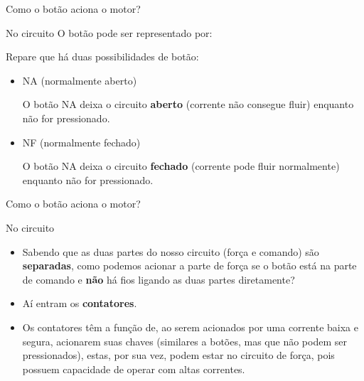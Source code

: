 \begin{frame}{Como o botão aciona o motor?}
	\begin{block}{No circuito}
		O botão pode ser representado por:
	\end{block}
	
	\medskip
	\begin{center}
	\end{center}
	
	\vspace{-1em}
	
	\begin{block}{}
		Repare que há duas possibilidades de botão:
		\begin{itemize}
			\item NA (normalmente aberto)
			
			O botão NA deixa o circuito \textbf{aberto} (corrente não consegue fluir) enquanto não for pressionado.
			\item NF (normalmente fechado)
			
			O botão NA deixa o circuito \textbf{fechado} (corrente pode fluir normalmente) enquanto não for pressionado.
		\end{itemize}
	\end{block}
\end{frame}


\begin{frame}{Como o botão aciona o motor?}
	\begin{block}{No circuito}
		\begin{itemize}
			\item Sabendo que as duas partes do nosso circuito (força e comando) são \textbf{separadas}, como podemos acionar a parte de força se o botão está na parte de comando e \textbf{não} há fios ligando as duas partes diretamente?
			\item Aí entram os \textbf{contatores}.
			\item Os contatores têm a função de, ao serem acionados por uma corrente baixa e segura, acionarem suas chaves (similares a botões, mas que não podem ser pressionados), estas, por sua vez, podem estar no circuito de força, pois possuem capacidade de operar com altas correntes.
		\end{itemize}
	\end{block}
\end{frame}

